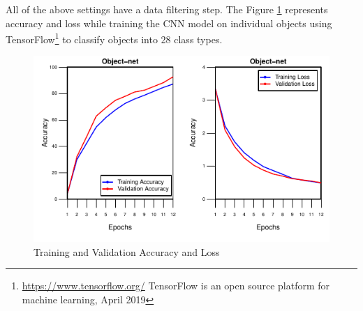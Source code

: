 All of the above settings have a data filtering step. The Figure \ref{fig:accloss} represents accuracy and loss while training the CNN model
on individual objects
using TensorFlow\footnote{\url{https://www.tensorflow.org/} TensorFlow is an open source platform
for machine learning, April 2019} to classify objects into 28 class types.




\begin{figure}[htp]
\begin{center}
        \includegraphics[scale=1]{images/one_to_one.pdf}
        \caption{Training and Validation Accuracy and Loss}
        \label{fig:accloss}
\end{center}
\end{figure}








